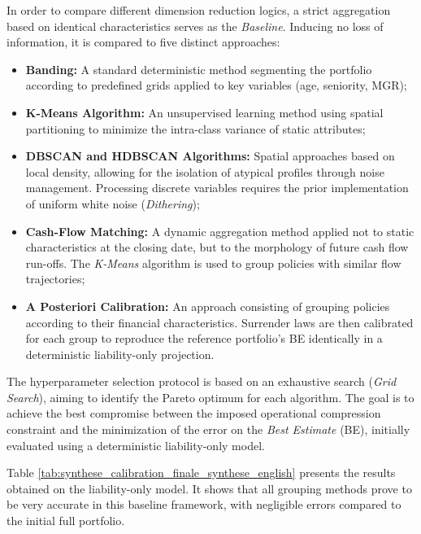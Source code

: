 In order to compare different dimension reduction logics, a strict aggregation based on identical characteristics serves as the \textit{Baseline}. Inducing no loss of information, it is compared to five distinct approaches:
\begin{itemize}
    \item \textbf{Banding:} A standard deterministic method segmenting the portfolio according to predefined grids applied to key variables (age, seniority, MGR);
    \item \textbf{K-Means Algorithm:} An unsupervised learning method using spatial partitioning to minimize the intra-class variance of static attributes;
    \item \textbf{DBSCAN and HDBSCAN Algorithms:} Spatial approaches based on local density, allowing for the isolation of atypical profiles through noise management. Processing discrete variables requires the prior implementation of uniform white noise (\textit{Dithering});
    \item \textbf{Cash-Flow Matching:} A dynamic aggregation method applied not to static characteristics at the closing date, but to the morphology of future cash flow run-offs. The \textit{K-Means} algorithm is used to group policies with similar flow trajectories;
    \item \textbf{A Posteriori Calibration:} An approach consisting of grouping policies according to their financial characteristics. Surrender laws are then calibrated for each group to reproduce the reference portfolio's BE identically in a deterministic liability-only projection.
\end{itemize}

The hyperparameter selection protocol is based on an exhaustive search (\textit{Grid Search}), aiming to identify the Pareto optimum for each algorithm. The goal is to achieve the best compromise between the imposed operational compression constraint and the minimization of the error on the \textit{Best Estimate} (BE), initially evaluated using a deterministic liability-only model.

Table \ref{tab:synthese_calibration_finale_synthese_english} presents the results obtained on the liability-only model. It shows that all grouping methods prove to be very accurate in this baseline framework, with negligible errors compared to the initial full portfolio.

